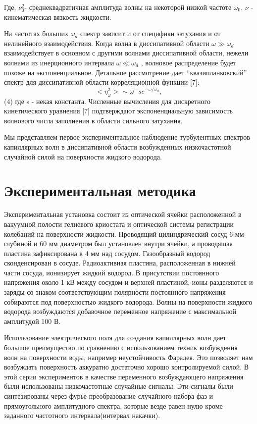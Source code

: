 Где, $\nu_0^2$- среднеквадратичная амплитуда волны на некоторой низкой частоте $\omega_0$, $\nu$ - кинематическая вязкость жидкости.

На частотах больших $\omega_d$ спектр зависит и от специфики затухания и от нелинейного взаимодействия. Когда волна в диссипативной области $\omega \gg \omega_d$ взаимодействует в основном с другими волнами диссипативной области, нежели волнами из инерционного интервала $\omega \ll \omega_d$ , волновое распределение будет похоже на экспоненциальное. Детальное рассмотрение дает “квазипланковский” спектр для диссипативной области корреляционной функции [7]:
\begin{equation}
<\eta_\omega^2> \sim \omega^-s e^{-\omega/\omega_d},
\end{equation}				(4)
где s - некая константа. Численные вычисления для дискретного кинетического уравнения [7] подтверждают экспоненциальную зависимость волнового числа заполнения в области сильного затухания.
	
	Мы представляем первое экспериментальное наблюдение турбулентных спектров капиллярных волн в диссипативной области возбужденных низкочастотной случайной силой на поверхности жидкого водорода.

\section{Экспериментальная методика} %
 Экспериментальная установка состоит из оптической ячейки расположенной в вакуумной полости гелиевого криостата и оптической системы регистрации колебаний на поверхности жидкости. Проводящий цилиндрический сосуд 6 мм глубиной и 60 мм диаметром был установлен внутри ячейки, а проводящая пластина зафиксирована в 4 мм над сосудом. Газообразный водород сконденсирован в сосуде. Радиоактивная пластина, расположенная в нижней части сосуда, ионизирует жидкий водород. В присутствии постоянного напряжения около 1 кВ между сосудом и верхней пластиной, ионы разделяются и заряды со знаком соответствующим полярности постоянного напряжения собираются под поверхностью жидкого водорода. Волны на поверхности жидкого водорода возбуждаются добавочное переменное напряжение с максимальной амплитудой 100 В.

	Использование электрического поля для создания капиллярных волн дает большое преимущество по сравнению с использованием техник возбуждения волн на поверхности воды, например неустойчивость Фарадея. Это позволяет нам возбуждать поверхность аккуратно достаточно хорошо контролируемой силой. В этой серии экспериментов в качестве переменного возбуждающего напряжения были использованы низкочастотные случайные сигналы. Эти сигналы были синтезированы через фурье-преобразование случайного набора фаз и прямоугольного амплитудного спектра, которые везде равен нулю кроме заданного частотного интервала(интервал накачки).

